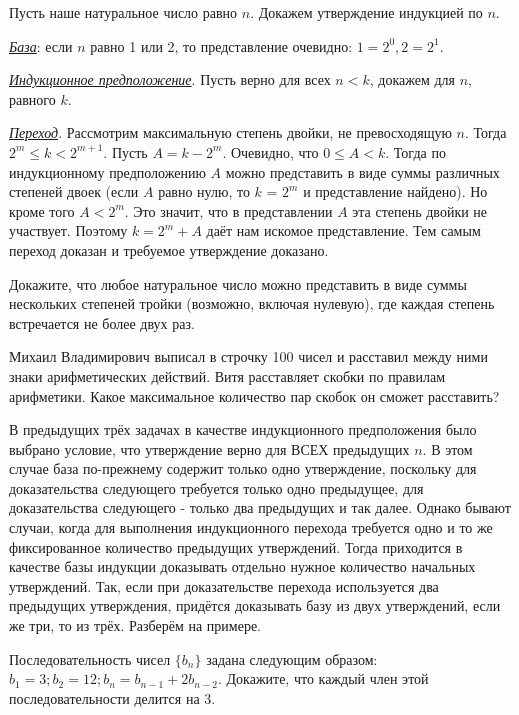 \begin{prf}
Пусть наше натуральное число равно $n$. Докажем утверждение индукцией по $n$. 
\par
\textit{\underline{База}}: если $n$ равно 1 или 2, то представление очевидно: $1 = 2^0, 2 = 2^1$. 
\par
\textit{\underline{Индукционное предположение}}. Пусть верно для всех $n < k$, докажем для $n$, равного $k$. 
\par
\textit{\underline{Переход}}. Рассмотрим максимальную степень двойки, не превосходящую $n$. Тогда $2^m \leq k < 2^{m + 1}$. Пусть $A = k - 2^m$. Очевидно, что $0 \leq A < k$. Тогда по индукционному предположению $A$ можно представить в виде суммы различных степеней двоек (если $A$ равно нулю, то $k$ = $2^m$ и представление найдено). Но кроме того $A < 2^m$. Это значит, что в представлении $A$ эта степень двойки не участвует. Поэтому $k = 2^m + A$ даёт нам искомое представление. Тем самым переход доказан и требуемое утверждение доказано. 
\end{prf}

\begin{thm}
Докажите, что любое натуральное число можно представить в виде суммы нескольких степеней тройки (возможно, включая нулевую), где каждая степень встречается не более двух раз.
\end{thm}

\begin{thm}
Михаил Владимирович выписал в строчку 100 чисел и расставил между ними знаки арифметических действий. Витя расставляет скобки по правилам арифметики. Какое максимальное количество пар скобок он сможет расставить?
\end{thm}

В предыдущих трёх задачах в качестве индукционного предположения было выбрано условие, что утверждение верно для ВСЕХ предыдущих $n$. В этом случае база по-прежнему содержит только одно утверждение, поскольку для доказательства следующего требуется только одно предыдущее, для доказательства следующего - только два предыдущих и так далее. Однако бывают случаи, когда для выполнения индукционного перехода требуется одно и то же фиксированное количество предыдущих утверждений. Тогда приходится в качестве базы индукции доказывать отдельно нужное количество начальных утверждений. Так, если при доказательстве перехода используется два предыдущих утверждения, придётся доказывать базу из двух утверждений, если же три, то из трёх. Разберём на примере.

\begin{thm}
Последовательность чисел $\{b_n\}$ задана следующим образом: $b_1 = 3; b_2 = 12; b_n = b_{n - 1}+ 2b_{n - 2}$. Докажите, что каждый член этой последовательности делится на 3.
\end{thm}

